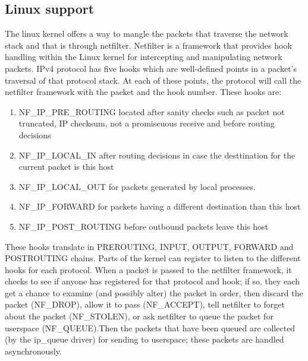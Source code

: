 {{\subsection{Linux support}
\label{sub-sec:nat-linux}
The linux kernel offers a way to mangle the packets that traverse the network stack and that is through netfilter. Netfilter is a framework that provides hook handling within the Linux kernel for intercepting and manipulating network packets. IPv4 protocol has five hooks which are well-defined points in a packet's traversal of that protocol stack. At each of these points, the protocol will call the netfilter framework with the packet and the hook number.
These hooks are:
\begin{enumerate}
\item NF_IP_PRE_ROUTING located after sanity checks such as packet not truncated, IP checksum, not a promiscuous receive and before routing decisions 
\item NF_IP_LOCAL_IN after routing decisions in case the desttination for the current packet is this host
\item NF_IP_LOCAL_OUT for packets generated by local processes. 
\item NF_IP_FORWARD for packets having a different destination than this host
\item NF_IP_POST_ROUTING before outbound packets leave this host 
\end{enumerate}
These hooks translate in PREROUTING, INPUT, OUTPUT, FORWARD and POSTROUTING chains.
Parts of the kernel can register to listen to the different hooks for each protocol. When a packet is passed to the netfilter framework, it checks to see if anyone has registered for that protocol and hook; if so, they each get a chance to examine (and possibly alter) the packet in order, then discard the packet (NF_DROP), allow it to pass (NF_ACCEPT), tell netfilter to forget about the packet (NF_STOLEN), or ask netfilter to queue the packet for userspace (NF_QUEUE).Then the packets that have been queued are collected (by the ip_queue driver) for sending to userspace; these packets are handled asynchronously.

}}
